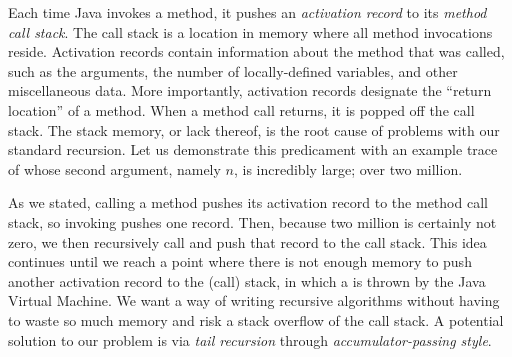 Each time Java invokes a method, it pushes an \emph{activation record} to its \emph{method call stack}. The call stack is a location in memory where all method invocations reside. Activation records contain information about the method that was called, such as the arguments, the number of locally-defined variables, and other miscellaneous data. More importantly, activation records designate the ``return location'' of a method. When a method call returns, it is popped off the call stack. The stack memory, or lack thereof, is the root cause of problems with our standard recursion. Let us demonstrate this predicament with an example trace of  whose second argument, namely $n$, is incredibly large; over two million.

As we stated, calling a method pushes its activation record to the method call stack, so invoking  pushes one record. Then, because two million is certainly not zero, we then recursively call  and push that record to the call stack. This idea continues until we reach a point where there is not enough memory to push another activation record to the (call) stack, in which a  is thrown by the Java Virtual Machine. We want a way of writing recursive algorithms without having to waste so much memory and risk a stack overflow of the call stack. A potential solution to our problem is via \emph{tail recursion} through \emph{accumulator-passing style}.


